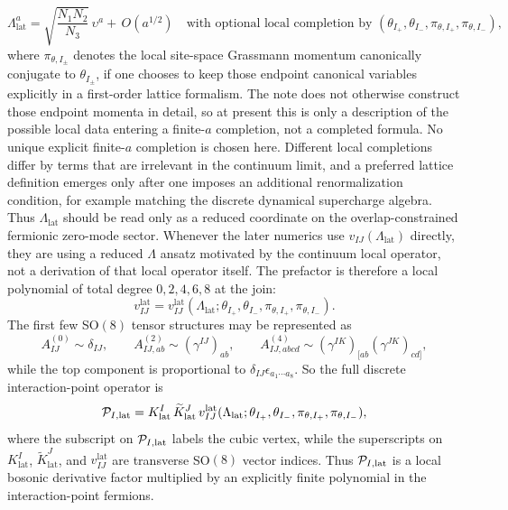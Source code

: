 \documentclass[11pt]{article}
\numberwithin{equation}{section}
\begin{document}
\begin{equation}
\label{eq:s14-024}
\Lambda_{\mathrm{lat}}^a = \sqrt{\frac{N_1N_2}{N_3}}\,\upsilon^a
+\,
O(a^{1/2})
\quad
\text{with optional local completion by }
(\theta_{I_+},\theta_{I_-},\pi_{\theta,I_+},\pi_{\theta,I_-}),
\end{equation}
where $\pi_{\theta,I_\pm}$ denotes the local site-space Grassmann momentum canonically conjugate to $\theta_{I_\pm}$, if one chooses to keep those endpoint canonical variables explicitly in a first-order lattice formalism. The note does not otherwise construct those endpoint momenta in detail, so at present this is only a description of the possible local data entering a finite-$a$ completion, not a completed formula. No unique explicit finite-$a$ completion is chosen here. Different local completions differ by terms that are irrelevant in the continuum limit, and a preferred lattice definition emerges only after one imposes an additional renormalization condition, for example matching the discrete dynamical supercharge algebra. Thus $\Lambda_{\mathrm{lat}}$ should be read only as a reduced coordinate on the overlap-constrained fermionic zero-mode sector. Whenever the later numerics use $v_{IJ}(\Lambda_{\mathrm{lat}})$ directly, they are using a reduced $\Lambda$ ansatz motivated by the continuum local operator, not a derivation of that local operator itself. The prefactor is therefore a local polynomial of total degree $0,2,4,6,8$ at the join:
\begin{equation}
\label{eq:s14-025}
v_{IJ}^{\mathrm{lat}} = v_{IJ}^{\mathrm{lat}}(\Lambda_{\mathrm{lat}};\theta_{I_+},\theta_{I_-},\pi_{\theta,I_+},\pi_{\theta,I_-}).
\end{equation}
The first few SO$(8)$ tensor structures may be represented as
\begin{equation}
\label{eq:s14-026}
A^{(0)}_{IJ}\sim \delta_{IJ},
\qquad
A^{(2)}_{IJ,ab}\sim (\gamma^{IJ})_{ab},
\qquad
A^{(4)}_{IJ,abcd}\sim (\gamma^{IK})_{[ab}(\gamma^{JK})_{cd]},
\end{equation}
while the top component is proportional to $\delta_{IJ}\epsilon_{a_1\cdots a_8}$. So the full discrete interaction-point operator is
\begin{equation}
\label{eq:s14-027}
{\cal P}_{I,\mathrm{lat}}
=
K^I_{\mathrm{lat}}\,\widetilde K^J_{\mathrm{lat}}\,
v_{IJ}^{\mathrm{lat}}(\Lambda_{\mathrm{lat}};\theta_{I_+},\theta_{I_-},\pi_{\theta,I_+},\pi_{\theta,I_-}),
\end{equation}
where the subscript on ${\cal P}_{I,\mathrm{lat}}$ labels the cubic vertex, while the superscripts on $K^I_{\mathrm{lat}}$, $\widetilde K^J_{\mathrm{lat}}$, and $v^{\mathrm{lat}}_{IJ}$ are transverse SO$(8)$ vector indices.
Thus ${\cal P}_{I,\mathrm{lat}}$ is a local bosonic derivative factor multiplied by an explicitly finite polynomial in the interaction-point fermions.
\end{document}
